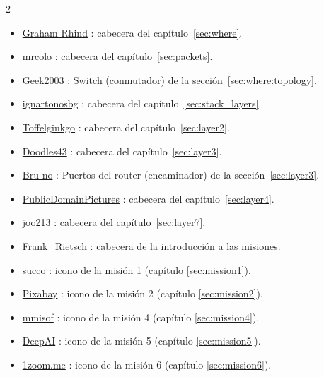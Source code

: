 \begin{multicols}{2}
\begin{itemize}
\item \href{https://www.pinterest.com/pin/118289927683058369/}{Graham Rhind} : cabecera del capítulo~\ref{sec:where}.
\item \href{https://pixabay.com/photos/container-goods-ship-port-cargo-4675851/}{mrcolo} : cabecera del capítulo~\ref{sec:packets}.
\item \href{https://commons.wikimedia.org/wiki/File:2550T-PWR-Front.jpg}{Geek2003} : Switch (conmutador) de la sección~\ref{sec:where:topology}.
\item \href{https://pixabay.com/photos/vegetable-onion-flavor-ingredient-6829271/}{ignartonosbg} : cabecera del capítulo~\ref{sec:stack_layers}.
\item \href{https://commons.wikimedia.org/wiki/File:Winter_2004_DreamHack_LAN_Party.jpg}{Toffelginkgo} : cabecera del capítulo~\ref{sec:layer2}.
\item \href{https://pixabay.com/photos/golden-gate-bridge-san-francisco-1549662/}{Doodles43} : cabecera del capítulo~\ref{sec:layer3}.
\item \href{https://pixabay.com/photos/network-edp-plug-patch-cord-4393368/}{Bru-no} : Puertos del router (encaminador) de la sección~\ref{sec:layer3}.
\item \href{https://pixabay.com/photos/green-plastic-pipes-culvert-water-72772/}{PublicDomainPictures} : cabecera del capítulo~\ref{sec:layer4}.
\item \href{https://pixabay.com/vectors/logo-icon-icon-collection-flat-1727647/}{joo213} : cabecera del capítulo~\ref{sec:layer7}.
\item \href{https://pixabay.com/illustrations/ai-generated-mars-astronaut-9072070/}{Frank\_Rietsch} : cabecera de la introducción a las misiones.
\item \href{https://pixabay.com/photos/abacus-calculate-mathematics-485704/}{succo} : icono de la misión 1 (capítulo \ref{sec:mission1}).
\item \href{https://pixabay.com/photos/stairway-spiral-stairs-architecture-5551641/}{Pixabay} : icono de la misión 2 (capítulo \ref{sec:mission2}).
\item \href{https://pixabay.com/photos/raisting-satellite-reception-signal-1010862/}{mmisof} : icono de la misión 4 (capítulo \ref{sec:mission4}).
\item \href{https://deepai.org/machine-learning-model/text2img}{DeepAI} : icono de la misión 5 (capítulo \ref{sec:mission5}).
\item \href{https://www.1zoom.me/en/wallpaper/588855/z3815.7/1080x1920}{1zoom.me} : icono de la misión 6 (capítulo \ref{sec:mission6}).

\end{itemize}
\end{multicols}
